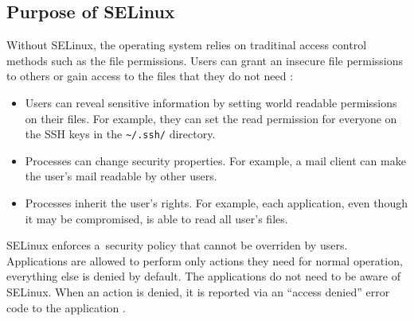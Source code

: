 \subsection{Purpose of SELinux}
Without SELinux, the operating system relies on traditinal access control
methods such as the file permissions. Users can grant an insecure file
permissions to others or gain access to the files that they do not need
\cite{selinuxguide}:
\begin{itemize}
    \item Users can reveal sensitive information by setting world readable
        permissions on their files. For example, they can set the read
        permission for everyone on the SSH keys in the
        \texttt{\textasciitilde/.ssh/} directory.
    \item Processes can change security properties. For example, a mail client
        can make the user's mail readable by other users.
    \item Processes inherit the user's rights. For example, each application,
        even though it may be compromised, is able to read all user's files.
\end{itemize}

SELinux enforces a~security policy that cannot be overriden by users.
Applications are allowed to perform only actions they need for normal operation,
everything else is denied by default. The applications do not need to be aware
of SELinux. When an action is denied, it is reported via an ``access denied''
error code to the application \cite{centoshowto}.

%
%    
%
%


